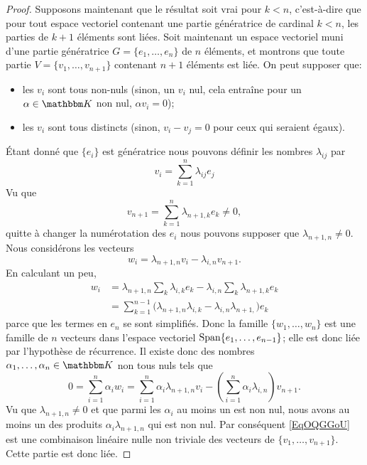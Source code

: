 \begin{proof}
    Supposons maintenant que le résultat soit vrai pour \( k<n\), c'est-à-dire que pour tout espace vectoriel contenant une partie génératrice de cardinal \( k<n\), les parties de \( k+1\) éléments sont liées. Soit maintenant un espace vectoriel muni d'une partie génératrice \( G=\{ e_1,\ldots, e_n \}\) de \( n\) éléments, et montrons que toute partie \( V=\{ v_1,\ldots, v_{n+1} \}\) contenant \( n+1\) éléments est liée. On peut supposer que:
    \begin{itemize}
      \item
        les \( v_i \) sont tous non-nuls (sinon, un \( v_i \) nul, cela entraîne pour un \( \alpha \in \eK \) non nul, \( \alpha v_i = 0 \));
      \item
        les \( v_i \) sont tous distincts (sinon, \( v_i - v_j  = 0 \) pour ceux qui seraient égaux).
    \end{itemize}
    Étant donné que \( \{ e_i \}\) est génératrice nous pouvons définir les nombres \( \lambda_{ij}\) par
    \begin{equation}
        v_i=\sum_{k=1}^n\lambda_{ij}e_j
    \end{equation}
    Vu que
    \begin{equation}
        v_{n+1}=\sum_{k=1}^n\lambda_{n+1,k}e_k\neq 0,
    \end{equation}
    quitte à changer la numérotation des \( e_i\) nous pouvons supposer que \( \lambda_{n+1,n}\neq 0\). Nous considérons les vecteurs
    \begin{equation}
        w_i=\lambda_{n+1,n}v_i-\lambda_{i,n}v_{n+1}.
    \end{equation}
    En calculant un peu,
    \begin{subequations}
        \begin{align}
            w_i&=\lambda_{n+1,n}\sum_k\lambda_{i,k}e_k-\lambda_{i,n}\sum_k\lambda_{n+1,k}e_k\\
            &=\sum_{k=1}^{n-1}\big( \lambda_{n+1,n}\lambda_{i,k}-\lambda_{i,n}\lambda_{n+1,} \big)e_k
        \end{align}
    \end{subequations}
    parce que les termes en \( e_n\) se sont simplifiés. Donc la famille \( \{ w_1,\ldots, w_n \}\) est une famille de \( n\) vecteurs dans l'espace vectoriel \( \operatorname{Span}\{ e_1,\ldots, e_{n-1} \}\); elle est donc liée par l'hypothèse de récurrence. Il existe donc des nombres \( \alpha_1,\ldots, \alpha_n\in \eK\) non tous nuls tels que
    \begin{equation}        \label{EqOQGGoU}
        0=\sum_{i=1}^n\alpha_iw_i=\sum_{i=1}^n\alpha_i\lambda_{n+1,n}v_i-\left( \sum_{i=1}^n\alpha_i\lambda_{i,n} \right)v_{n+1}.
    \end{equation}
    Vu que \( \lambda_{n+1,n}\neq 0\) et que parmi les \( \alpha_i\) au moins un est non nul, nous avons au moins un des produits \( \alpha_i\lambda_{n+1,n}\) qui est non nul. Par conséquent \eqref{EqOQGGoU} est une combinaison linéaire nulle non triviale des vecteurs de \( \{ v_1,\ldots, v_{n+1} \}\). Cette partie est donc liée.
\end{proof}

